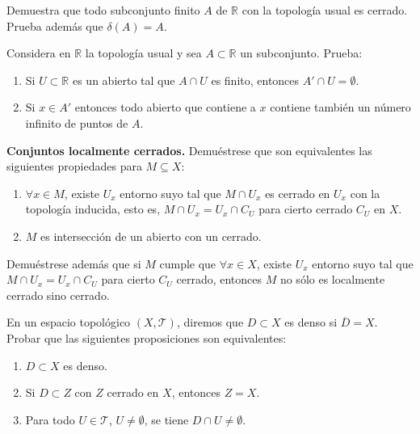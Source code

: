 \begin{ejer}[52]
Demuestra que todo subconjunto finito $A$ de $\mathbb{R}$ con la topología usual es cerrado. Prueba además que $\delta(A) = A$.
\end{ejer}

\begin{ejer}[53]
Considera en $\mathbb{R}$ la topología usual y sea $A \subset \mathbb{R}$ un subconjunto. Prueba:
\begin{enumerate}
    \item[a)] Si $U \subset \mathbb{R}$ es un abierto tal que $A \cap U$ es finito, entonces $A' \cap U = \emptyset$.
    \item[b)] Si $x \in A'$ entonces todo abierto que contiene a $x$ contiene también un número infinito de puntos de $A$.
\end{enumerate}
\end{ejer}

\begin{ejer}[54]
\textbf{Conjuntos localmente cerrados.} Demuéstrese que son equivalentes las siguientes propiedades para $M \subseteq X$:
\begin{enumerate}
    \item[a)] $\forall x \in M$, existe $U_x$ entorno suyo tal que $M \cap U_x$ es cerrado en $U_x$ con la topología inducida, esto es, $M \cap U_x = U_x \cap C_U$ para cierto cerrado $C_U$ en $X$.
    \item[b)] $M$ es intersección de un abierto con un cerrado.
\end{enumerate}
Demuéstrese además que si $M$ cumple que $\forall x \in X$, existe $U_x$ entorno suyo tal que $M \cap U_x = U_x \cap C_U$ para cierto $C_U$ cerrado, entonces $M$ no sólo es localmente cerrado sino cerrado.
\end{ejer}

\begin{ejer}[55]
En un espacio topológico $(X, \mathcal{T})$, diremos que $D \subset X$ es denso si $\overline{D} = X$. Probar que las siguientes proposiciones son equivalentes:
\begin{enumerate}
    \item[a)] $D \subset X$ es denso.
    \item[b)] Si $D \subset Z$ con $Z$ cerrado en $X$, entonces $Z = X$.
    \item[c)] Para todo $U \in \mathcal{T}$, $U \neq \emptyset$, se tiene $D \cap U \neq \emptyset$.
\end{enumerate}
\end{ejer}

